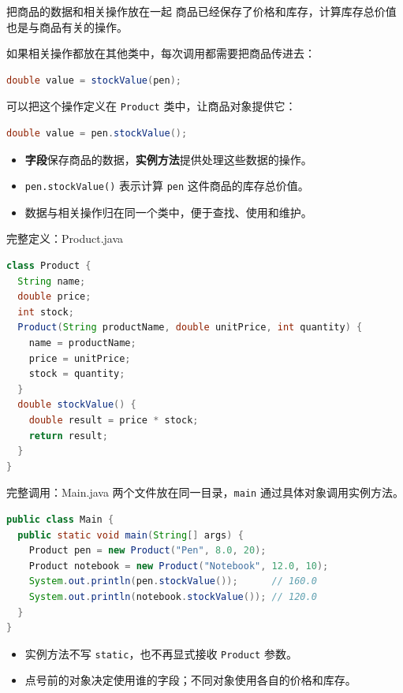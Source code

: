 \documentclass[aspectratio=169]{beamer}
\begin{document}
\begin{frame}[fragile]{把商品的数据和相关操作放在一起}
  商品已经保存了价格和库存，计算库存总价值也是与商品有关的操作。
  \par\medskip
  如果相关操作都放在其他类中，每次调用都需要把商品传进去：
  \begin{lstlisting}[language=Java]
double value = stockValue(pen);
  \end{lstlisting}
  可以把这个操作定义在 \texttt{Product} 类中，让商品对象提供它：
  \begin{lstlisting}[language=Java]
double value = pen.stockValue();
  \end{lstlisting}
  \begin{itemize}
    \item \textbf{字段}保存商品的数据，\textbf{实例方法}提供处理这些数据的操作。
    \item \texttt{pen.stockValue()} 表示计算 \texttt{pen} 这件商品的库存总价值。
    \item 数据与相关操作归在同一个类中，便于查找、使用和维护。
  \end{itemize}
\end{frame}

\begin{frame}[fragile]{完整定义：Product.java}
  \begin{lstlisting}[language=Java]
class Product {
  String name;
  double price;
  int stock;
  Product(String productName, double unitPrice, int quantity) {
    name = productName;
    price = unitPrice;
    stock = quantity;
  }
  double stockValue() {
    double result = price * stock;
    return result;
  }
}
  \end{lstlisting}
\end{frame}

\begin{frame}[fragile]{完整调用：Main.java}
  两个文件放在同一目录，\texttt{main} 通过具体对象调用实例方法。
  \begin{lstlisting}[language=Java]
public class Main {
  public static void main(String[] args) {
    Product pen = new Product("Pen", 8.0, 20);
    Product notebook = new Product("Notebook", 12.0, 10);
    System.out.println(pen.stockValue());      // 160.0
    System.out.println(notebook.stockValue()); // 120.0
  }
}
  \end{lstlisting}
  \begin{itemize}
    \item 实例方法不写 \texttt{static}，也不再显式接收 \texttt{Product} 参数。
    \item 点号前的对象决定使用谁的字段；不同对象使用各自的价格和库存。
  \end{itemize}
\end{frame}
\end{document}
